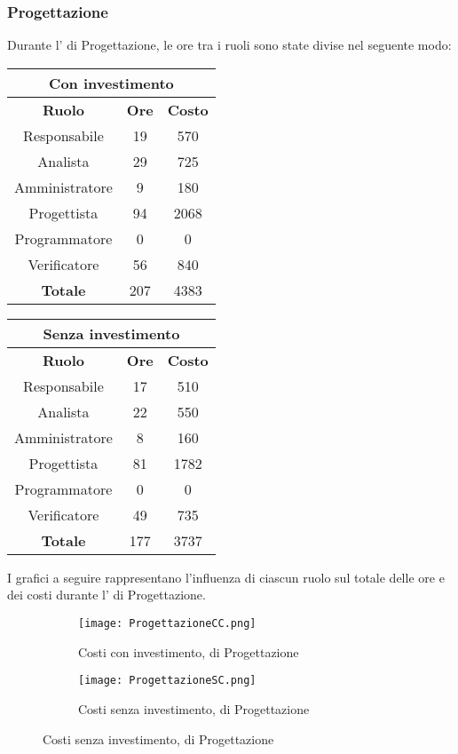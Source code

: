 \documentclass{scalatekids-article}
\begin{document}
\subsubsection{Progettazione}
Durante l' di Progettazione, le ore tra i ruoli sono state divise nel seguente modo:
\begin{center}
  \normalsize
  \begin{tabular}{| c | c | c |}
    \hline
    \multicolumn{3}{|c|}{\textbf{Con investimento}}\\
    \hline
    \textbf{Ruolo} & \textbf{Ore} & \textbf{Costo}\\
    \hline
    Responsabile & 19 & 570 \\
    Analista & 29 & 725 \\
    Amministratore & 9 & 180 \\
    Progettista & 94 & 2068\\
    Programmatore & 0 & 0\\
    Verificatore & 56 & 840 \\
    \hline
    \textbf{Totale} & 207 & 4383\\
    \hline
  \end{tabular}
  \qquad
  \begin{tabular}{| c | c | c |}
    \hline
    \multicolumn{3}{|c|}{\textbf{Senza investimento}}\\
    \hline
    \textbf{Ruolo} & \textbf{Ore} & \textbf{Costo}\\
    \hline
    Responsabile & 17 & 510\\
    Analista & 22 & 550\\
    Amministratore & 8 & 160\\
    Progettista & 81 & 1782\\
    Programmatore & 0 & 0\\
    Verificatore & 49 & 735\\
    \hline
    \textbf{Totale} & 177 & 3737 \\
    \hline
  \end{tabular}
\end{center}
I grafici a seguire rappresentano l'influenza di ciascun ruolo sul totale delle ore e dei costi durante l' di Progettazione.
\begin{figure}[H]
  \begin{subfigure}[H]{0.47\textwidth}
    \texttt{[image: ProgettazioneCC.png]}
    \caption*{Costi con investimento,  di Progettazione}
  \end{subfigure}
  \qquad
  \begin{subfigure}[H]{0.47\textwidth}
    \texttt{[image: ProgettazioneSC.png]}
    \caption*{Costi senza investimento,  di Progettazione}
  \end{subfigure}
\end{figure}
\newpage
\end{document}
